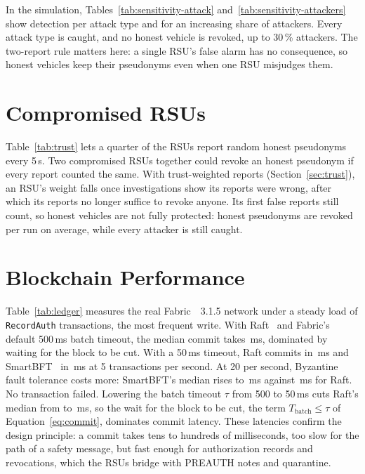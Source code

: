 
In the simulation, Tables~\ref{tab:sensitivity-attack} and~\ref{tab:sensitivity-attackers} show
detection per attack type and for an increasing share of attackers. Every attack type is caught,
and no honest vehicle is revoked, up to 30\,\% attackers. The two-report rule matters here: a
single RSU's false alarm has no consequence, so honest vehicles keep their pseudonyms even when one
RSU misjudges them.

\section{Compromised RSUs}\label{sec:res-trust}


Table~\ref{tab:trust} lets a quarter of the RSUs report random honest pseudonyms every 5\,s. Two
compromised RSUs together could revoke an honest pseudonym if every report counted the same. With
trust-weighted reports (Section~\ref{sec:trust}), an RSU's weight falls once investigations show its
reports were wrong, after which its reports no longer suffice to revoke anyone. Its first false
reports still count, so honest vehicles are not fully protected: 
honest pseudonyms are revoked per run on average, while every attacker is still caught.

\section{Blockchain Performance}\label{sec:res-ledger}


Table~\ref{tab:ledger} measures the real Fabric~\cite{androulaki2018fabric}~3.1.5 network under a steady load of
\texttt{RecordAuth} transactions, the most frequent write. With Raft~\cite{ongaro2014raft} and Fabric's default 500\,ms
batch timeout, the median commit takes \,ms, dominated by waiting for the
block to be cut. With a 50\,ms timeout, Raft commits in \,ms and SmartBFT~\cite{barger2021smartbft}
in \,ms at 5 transactions per second. At 20 per second, Byzantine~\cite{lamport1982byzantine} fault
tolerance costs more: SmartBFT's median rises to \,ms against
\,ms for Raft. No transaction failed. Lowering the batch timeout $\tau$ from
500 to 50\,ms cuts Raft's median from  to \,ms,
so the wait for the block to be cut, the term $T_{\mathrm{batch}} \le \tau$ of
Equation~\eqref{eq:commit}, dominates commit latency. These latencies confirm the design
principle: a commit takes tens to hundreds of milliseconds, too slow for the path of a safety message,
but fast enough for authorization records and revocations, which the RSUs bridge with PREAUTH notes
and quarantine.

